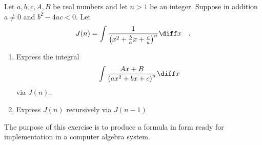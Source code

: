 
Let $a, b, c, A, B$ be real numbers and let $n>1$ be an integer. Suppose in addition $a\neq 0$ and $b^2-4ac<0$. Let 
\[
J(n)=\int \frac{1}{ \left( x^2+\frac{b}{a}x + \frac{ c}{a}\right)^n}\diff x\quad .
\]
\begin{enumerate}[ref={\fcProblemRef}]
\item \label{problemIntegrateBuildingBlockIIandIIIbPart1} Express the integral 
\[
\int \frac{Ax +B}{ \left( ax^2 +bx +c\right)^n}\diff x
\]
via $J(n)$.
\item \label{problemIntegrateBuildingBlockIIandIIIbPart2} Express $J(n)$ recursively via $J(n-1)$
\end{enumerate}
The purpose of this exercise is to produce a formula in form ready for implementation in a computer algebra system.